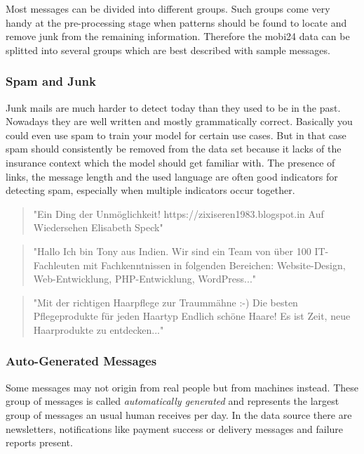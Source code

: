 Most messages can be divided into different groups. Such groups come very handy at the pre-processing stage when patterns should be
found to locate and remove junk from the remaining information. Therefore the mobi24 data can be splitted into several groups which
are best described with sample messages.

\subsubsection{Spam and Junk}

Junk mails are much harder to detect today than they used to be in the past. Nowadays they are well written and mostly grammatically
correct. Basically you could even use spam to train your model for certain use cases. But in that case spam should consistently be
removed from the data set because it lacks of the insurance context which the model should get familiar with. The presence of links,
the message length and the used language are often good indicators for detecting spam, especially when multiple indicators occur together.

\begin{quote}
    "Ein Ding der Unmöglichkeit! https://zixiseren1983.blogspot.in Auf Wiedersehen Elisabeth Speck"
\end{quote}

\begin{quote}
    "Hallo Ich bin Tony aus Indien. Wir sind ein Team von über 100 IT-Fachleuten mit Fachkenntnissen in folgenden Bereichen: Website-Design, Web-Entwicklung, PHP-Entwicklung, WordPress..."
\end{quote}

\begin{quote}
    "Mit der richtigen Haarpflege zur Traummähne :-) Die besten Pflegeprodukte für jeden Haartyp Endlich schöne Haare! Es ist Zeit, neue Haarprodukte zu entdecken..."
\end{quote}

\subsubsection{Auto-Generated Messages}

Some messages may not origin from real people but from machines instead. These group of messages is called \emph{automatically generated}
and represents the largest group of messages an usual human receives per day. In the data source there are newsletters, notifications
like payment success or delivery messages and failure reports present.

